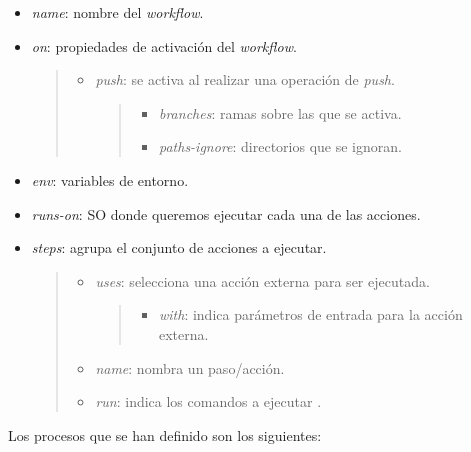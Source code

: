 \begin{itemize}
\tightlist
\item
  \emph{name}: nombre del \emph{workflow}.
\item
  \emph{on}: propiedades de activación del \emph{workflow}.

  \begin{quote}
  \begin{itemize}
  \item
    \emph{push}: se activa al realizar una operación de \emph{push}.

    \begin{quote}
    \begin{itemize}
    \tightlist
    \item
      \emph{branches}: ramas sobre las que se activa.
    \item
      \emph{paths-ignore}: directorios que se ignoran.
    \end{itemize}
    \end{quote}
  \end{itemize}
  \end{quote}
\item
  \emph{env}: variables de entorno.
\item
  \emph{runs-on}: SO donde queremos ejecutar cada una de las acciones.
\item
  \emph{steps}: agrupa el conjunto de acciones a ejecutar.

  \begin{quote}
  \begin{itemize}
  \item
    \emph{uses}: selecciona una acción externa para ser ejecutada.

    \begin{quote}
    \begin{itemize}
    \tightlist
    \item
      \emph{with}: indica parámetros de entrada para la acción externa.
    \end{itemize}
    \end{quote}
  \item
    \emph{name}: nombra un paso/acción.
  \item
    \emph{run}: indica los comandos a ejecutar .
  \end{itemize}
  \end{quote}
\end{itemize}

Los procesos que se han definido son los siguientes:

